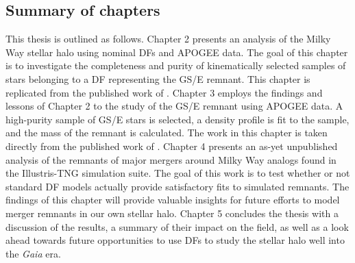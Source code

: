 \subsection{Summary of chapters}

This thesis is outlined as follows. Chapter 2 presents an analysis of the Milky Way stellar halo using nominal DFs and APOGEE data. The goal of this chapter is to investigate the completeness and purity of kinematically selected samples of stars belonging to a DF representing the GS/E remnant. This chapter is replicated from the published work of \textcite{lane22}. Chapter 3 employs the findings and lessons of Chapter 2 to the study of the GS/E remnant using APOGEE data. A high-purity sample of GS/E stars is selected, a density profile is fit to the sample, and the mass of the remnant is calculated. The work in this chapter is taken directly from the published work of \textcite{lane23}. Chapter 4 presents an as-yet unpublished analysis of the remnants of major mergers around Milky Way analogs found in the Illustris-TNG simulation suite. The goal of this work is to test whether or not standard DF models actually provide satisfactory fits to simulated remnants. The findings of this chapter will provide valuable insights for future efforts to model merger remnants in our own stellar halo. Chapter 5 concludes the thesis with a discussion of the results, a summary of their impact on the field, as well as a look ahead towards future opportunities to use DFs to study the stellar halo well into the \textit{Gaia} era.
